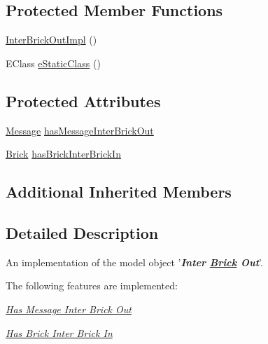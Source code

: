\subsection*{Protected Member Functions}
\begin{DoxyCompactItemize}
\item 
\hyperlink{classshootingmachineemfmodel_1_1impl_1_1_inter_brick_out_impl_a347fc2a62b66855f60482214f8860cb6}{Inter\-Brick\-Out\-Impl} ()
\item 
E\-Class \hyperlink{classshootingmachineemfmodel_1_1impl_1_1_inter_brick_out_impl_a9aadb36f103fa62dec3a4e2cb1496e53}{e\-Static\-Class} ()
\end{DoxyCompactItemize}
\subsection*{Protected Attributes}
\begin{DoxyCompactItemize}
\item 
\hyperlink{interfaceshootingmachineemfmodel_1_1_message}{Message} \hyperlink{classshootingmachineemfmodel_1_1impl_1_1_inter_brick_out_impl_ab81c612eaddbc8b20f373ecb407a53e2}{has\-Message\-Inter\-Brick\-Out}
\item 
\hyperlink{interfaceshootingmachineemfmodel_1_1_brick}{Brick} \hyperlink{classshootingmachineemfmodel_1_1impl_1_1_inter_brick_out_impl_a3928a8dbdfe4dd12906b05934d550e06}{has\-Brick\-Inter\-Brick\-In}
\end{DoxyCompactItemize}
\subsection*{Additional Inherited Members}


\subsection{Detailed Description}
An implementation of the model object '{\itshape {\bfseries Inter \hyperlink{interfaceshootingmachineemfmodel_1_1_brick}{Brick} Out}}'.

The following features are implemented\-: 
\begin{DoxyItemize}
\item \hyperlink{classshootingmachineemfmodel_1_1impl_1_1_inter_brick_out_impl_a3e64e1506f7b5f296ccfe42cc7e9adca}{{\itshape Has Message Inter Brick Out}} 
\item \hyperlink{classshootingmachineemfmodel_1_1impl_1_1_inter_brick_out_impl_a9ce1832253cd613758fcf2c1ba674f15}{{\itshape Has Brick Inter Brick In}} 
\end{DoxyItemize}

